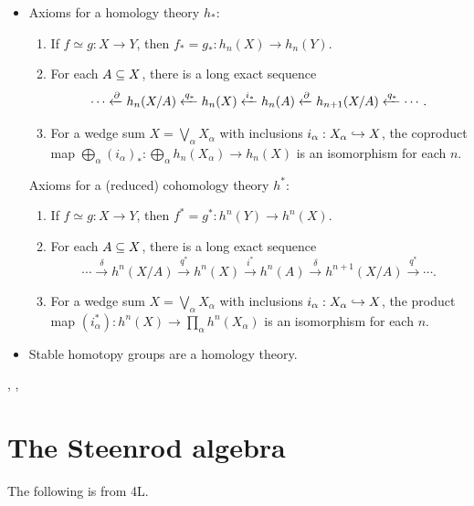 \documentclass{MetricNotes2023}
\def\subq{\ensuremath\subseteq}
\def\inj{\ensuremath\hookrightarrow}
\def\del{\ensuremath\partial}
\begin{document}
\begin{itemize}
\item Axioms for a homology theory \(h_*\):
\begin{enumerate}
\item If \(f\simeq g : X \to Y\), then \(f_*=g_* : h_n(X)\to h_n(Y)\).
\item For each \(A\subq X\), there is a long exact sequence
\[\cdots \xleftarrow{\del}h_n(X/A)\xleftarrow{q_*}h_n(X) \xleftarrow{i_*}h_n(A) \xleftarrow{\del} h_{n+1}(X/A)\xleftarrow{q_*}\cdots.\]
\item For a wedge sum \(X=\bigvee_\alpha X_\alpha\) with inclusions \(i_\alpha : X_\alpha \inj X\), the coproduct map \(\bigoplus_\alpha (i_\alpha)_* : \bigoplus_\alpha h_n(X_\alpha) \to  h_n(X)\) is an isomorphism for each \(n\). 
\end{enumerate}
Axioms for a (reduced) cohomology theory \(h^*\):
\begin{enumerate}
\item If \(f\simeq g : X \to Y\), then \(f^*=g^* : h^n(Y)\to h^n(X)\).
\item For each \(A\subq X\), there is a long exact sequence
\[\cdots \xrightarrow{\delta}h^n(X/A)\xrightarrow{q^*}h^n(X) \xrightarrow{i^*}h^n(A) \xrightarrow{\delta} h^{n+1}(X/A)\xrightarrow{q^*}\cdots.\]
\item For a wedge sum \(X=\bigvee_\alpha X_\alpha\) with inclusions \(i_\alpha : X_\alpha \inj X\), the product map \((i^*_\alpha) : h^n(X) \to \prod_\alpha h^n(X_\alpha)\) is an isomorphism for each \(n\).
\end{enumerate}
\item Stable homotopy groups are a homology theory.
\end{itemize}

\autocite{ass}, \autocite{suspension}, \autocite{hatcher}

\section{The Steenrod algebra}\label{2503221247}

The following is from \autocite{hatcher} 4L.
\end{document}
